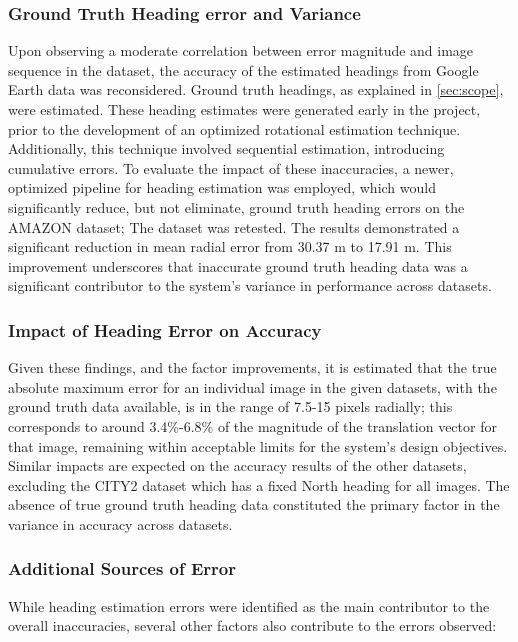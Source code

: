 \subsubsection{Ground Truth Heading error and Variance}

Upon observing a moderate correlation between error magnitude and image sequence in the dataset, the accuracy of the estimated headings from Google Earth data was reconsidered. Ground truth headings, as explained in \ref{sec:scope}, were estimated. These heading estimates were generated early in the project, prior to the development of an optimized rotational estimation technique. Additionally, this technique involved sequential estimation, introducing cumulative errors. To evaluate the impact of these inaccuracies, a newer, optimized pipeline for heading estimation was employed, which would significantly reduce, but not eliminate, ground truth heading errors on the AMAZON dataset; The dataset was retested. The results demonstrated a significant reduction in mean radial error from 30.37 m to 17.91 m. This improvement underscores that inaccurate ground truth heading data was a significant contributor to the system's variance in performance across datasets.

\subsubsection{Impact of Heading Error on Accuracy}

Given these findings, and the factor improvements, it is estimated that the true absolute maximum error for an individual image in the given datasets, with the ground truth data available, is in the range of 7.5-15 pixels radially; this corresponds to around 3.4\%-6.8\% of the magnitude of the translation vector for that image, remaining within acceptable limits for the system's design objectives. Similar impacts are expected on the accuracy results of the other datasets, excluding the CITY2 dataset which has a fixed North heading for all images. The absence of true ground truth heading data constituted the primary factor in the variance in accuracy across datasets.

\subsubsection{Additional Sources of Error}

While heading estimation errors were identified as the main contributor to the overall inaccuracies, several other factors also contribute to the errors observed:

